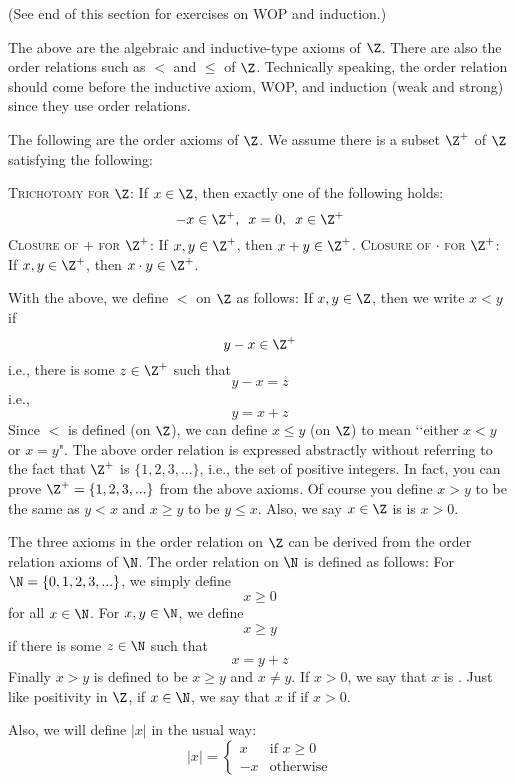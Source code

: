 (See end of this section for exercises on WOP and induction.)

The above are the algebraic and inductive-type axioms of $\Z$.
There are also the order relations such as $<$ and $\leq$
of $\Z$.
Technically speaking, the order relation should come before
the inductive axiom, WOP, and induction (weak and strong) since they use
order relations.

The following are the order axioms of $\Z$.
We assume there is a subset $\Z^+$ \index{$\Z^+$}\tinysidebar{$\Z^+$}
of $\Z$ satisfying the following:
\begin{enumerate}[nosep]
  \li \textsc{Trichotomy for $\Z$}:
  If $x \in \Z$, then exactly one of the following holds:
  \[
  -x \in \Z^+,  \,\,\, x = 0, \,\,\, x \in \Z^+
  \]
  \li \textsc{Closure of $+$ for $\Z^+$}:
  If $x,y \in \Z^+$, then $x + y \in \Z^+$.
  \li \textsc{Closure of $\cdot$ for $\Z^+$}: If $x,y \in \Z^+$, then $x \cdot y \in \Z^+$.
\end{enumerate}
With the above, we define
$<$ \index{$<$}\tinysidebar{$<$} on $\Z$
as follows:
If $x, y \in \Z$, then we write $x < y$ if
\[
y - x \in \Z^+
\]
i.e., there is some $z \in \Z^+$ such that
\[
y - x = z
\]
i.e.,
\[
y = x + z
\]
Since $<$ is defined (on $\Z$), we can define
$x \leq y$ (on $\Z$) \index{$\leq$}\tinysidebar{$\leq$}
to mean \lq\lq either $x < y$ or $x = y$".
The above order relation is expressed abstractly without referring to the fact
that
$\Z^+$ is $\{1, 2, 3, ...\}$, i.e., the set of positive integers.
In fact, you can prove $\Z^+ = \{1, 2, 3, ...\}$ from the above axioms.
Of course you define $x > y$ to be the same as $y < x$ and
$x \geq y$ to be $y \leq x$.
Also, we say $x \in \Z$ is  is $x > 0$.

The three axioms in the order relation on $\Z$ can be derived from the order
relation axioms of $\N$.
The order relation on $\N$ is defined as follows:
For $\N = \{0, 1, 2, 3, ...\}$, we simply define
\[
x \geq 0
\]
for all $x \in \N$.
For $x, y \in \N$, we define
\[
x \geq y
\]
if there is some $z \in \N$ such that
\[
x = y + z
\]
Finally $x > y$ is defined to be $x \geq y$ and $x \neq y$.
If $x > 0$, we say that $x$ is .
Just like positivity in $\Z$,
if $x \in \N$, we say that $x$ if  if $x > 0$.

Also, we will define $|x|$ in the usual way:
\[
|x| =
\begin{cases}
x  & \text{if } x \geq 0 \\
-x & \text{otherwise}
\end{cases}
\]

